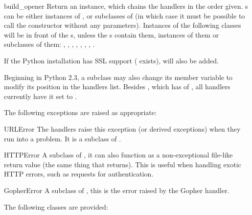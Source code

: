 \begin{funcdesc}{build_opener}{}
Return an  instance, which chains the
handlers in the order given. s can be either instances
of , or subclasses of  (in
which case it must be possible to call the constructor without
any parameters).  Instances of the following classes will be in
front of the s, unless the s contain
them, instances of them or subclasses of them:
, , ,
, ,
, , .

If the Python installation has SSL support (
exists),  will also be added.

Beginning in Python 2.3, a  subclass may also
change its  member variable to modify its
position in the handlers list. Besides , which has
 of , all handlers currently have it
set to .
\end{funcdesc}


The following exceptions are raised as appropriate:

\begin{excdesc}{URLError}
The handlers raise this exception (or derived exceptions) when they
run into a problem.  It is a subclass of .
\end{excdesc}

\begin{excdesc}{HTTPError}
A subclass of , it can also function as a 
non-exceptional file-like return value (the same thing that
 returns).  This is useful when handling exotic
HTTP errors, such as requests for authentication.
\end{excdesc}

\begin{excdesc}{GopherError}
A subclass of , this is the error raised by the
Gopher handler.
\end{excdesc}


The following classes are provided:

